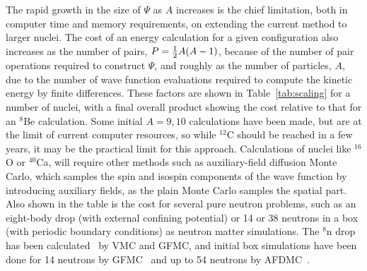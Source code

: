 The rapid growth in the size of $\Psi$ as $A$ increases is the chief
limitation, both in computer time and memory requirements, on extending
the current method to larger nuclei.
The cost of an energy calculation for a given configuration also increases
as the number of pairs, $P = \textstyle{1\over2}A(A-1)$, because of the number of
pair operations required to construct $\Psi$, and roughly as the number
of particles, $A$, due to the number of wave function evaluations required
to compute the kinetic energy by finite differences.
These factors are shown in Table~\ref{tab:scaling} for a number of nuclei,
with a final overall product showing the cost relative to that for an
$^8$Be calculation.
Some initial $A=9,10$ calculations have been made, but are at the limit of
current computer resources, so while $^{12}$C should be reached in a few
years, it may be the practical limit for this approach.
Calculations of nuclei like $^{16}$O or $^{40}$Ca, will require other
methods such as auxiliary-field diffusion Monte Carlo, which samples the spin and isospin components
of the wave function by introducing auxiliary fields, as the plain Monte 
Carlo samples the spatial part.
Also shown in the table is the cost for several pure neutron problems, such 
as an eight-body drop (with external confining potential) or 14 or 38 neutrons
in a box (with periodic boundary conditions) as neutron matter simulations.
The $^8$n drop has been calculated~\cite{PSCPPR96,SRP97} by VMC
and GFMC, and initial box simulations have been done for
14 neutrons by GFMC~\cite{carlson} and up to 54 neutrons by AFDMC~\cite{SF99}.

